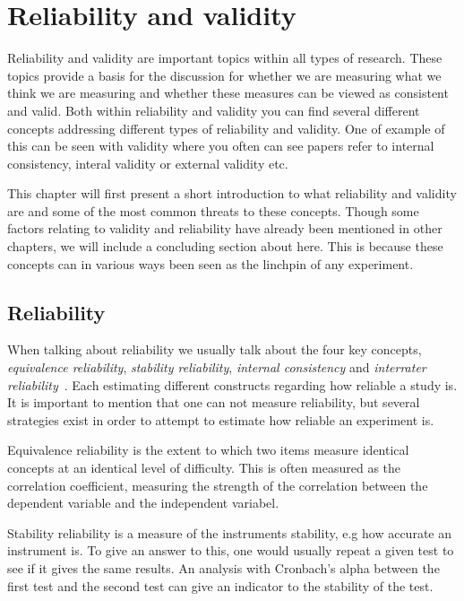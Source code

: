 \section{Reliability and validity}\label{sec:reliabilityLiterature}
Reliability and validity are important topics within all types of research. 
These topics provide a basis for the discussion for whether we are measuring what we think we are measuring and whether these measures can be viewed as consistent and valid. 
Both within reliability and validity you can find several different concepts addressing different types of reliability and validity. 
One of example of this can be seen with validity where you often can see papers refer to internal consistency, interal validity or external validity etc.

\bigskip\noindent
This chapter will first present a short introduction to what reliability and validity are and some of the most common threats to these concepts.  
Though some factors relating to validity and reliability have already been mentioned in other chapters, 
we will include a concluding section about here. 
This is because these concepts can in various ways been seen as the linchpin of any experiment.

\subsection*{Reliability}
	When talking about reliability we usually talk about the four key concepts, \textit{equivalence reliability}, \textit{stability reliability}, \textit{internal consistency} and  \textit{interrater reliability}~\cite{colostateReliability,laerdReliability}. 
	Each estimating different constructs regarding how reliable a study is. 
	It is important to mention that one can not measure reliability, but several strategies exist in order to attempt to estimate how reliable an experiment is.
	
	\bigskip\noindent
	Equivalence reliability is the extent to which two items measure identical concepts at an identical level of difficulty. This is often measured as the correlation coefficient, measuring the strength of the correlation between the dependent variable and the independent variabel. 
	
	\bigskip\noindent
	Stability reliability is a measure of the instruments stability, e.g how accurate an instrument is. To give an answer to this, one would usually repeat a given test to see if it gives the same results. An analysis with Cronbach's alpha between the first test and the second test can give an indicator to the stability of the test.
	
